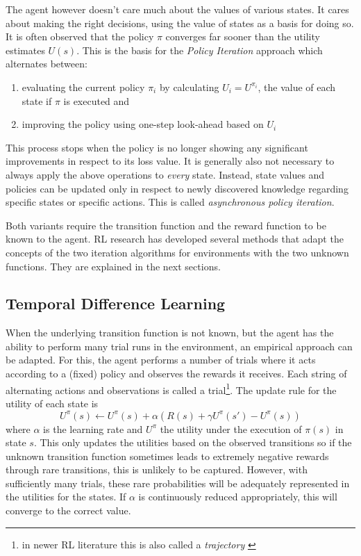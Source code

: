 The agent however doesn't care much about the values of various states. It cares about making the right
decisions, using the value of states as a basis for doing so. It is often observed that the policy $\pi$ converges far
sooner than the utility estimates $U(s)$. This is the basis for the \emph{Policy Iteration} approach which alternates
between:
\begin{enumerate}
    \item evaluating the current policy $\pi_i$ by calculating $U_i=U^{\pi_i}$, the value of each state if $\pi$ is
        executed and
    \item improving the policy using one-step look-ahead based on $U_i$
\end{enumerate}

This process stops when the policy is no longer showing any significant improvements in respect to its loss value. It is
generally also not necessary to always apply the above operations to \emph{every} state. Instead, state values and
policies can be updated only in respect to newly discovered knowledge regarding specific states or specific actions.
This is called \emph{asynchronous policy iteration}.

Both variants require the transition function and the reward function to be known to the agent. \ac{RL} research has
developed several methods that adapt the concepts of the two iteration algorithms for environments with the two unknown
functions. They are explained in the next sections.

\subsection{Temporal Difference Learning}%
\label{sub:temporal_difference_learning}

When the underlying transition function is not known, but the agent has the ability to perform many trial runs in the
environment, an empirical approach can be adapted. For this, the agent performs a number of trials where it acts
according to a (fixed) policy and observes the rewards it receives. Each string of alternating actions and observations
is called a trial\footnote{in newer \ac{RL} literature this is also called a \emph{trajectory} \citep{proximalpolicyopt, heess2017emergence} }.
The update rule for the utility of each state is
\begin{equation}
    U^\pi(s) \gets U^\pi(s) + \alpha(R(s) + \gamma U^\pi(s') - U^\pi(s))
\end{equation}
where $\alpha$ is the learning rate and $U^\pi$ the utility under the execution of $\pi(s)$ in state $s$. This only
updates the utilities based on the observed transitions so if the unknown transition function sometimes leads to
extremely negative rewards through rare transitions, this is unlikely to be captured. However, with sufficiently many
trials, these rare probabilities will be adequately represented in the utilities for the states. If $\alpha$ is
continuously reduced appropriately, this will converge to the correct value.


